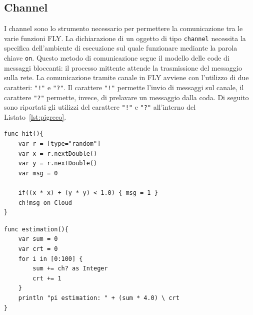 \subsection{Channel}
I channel sono lo strumento necessario per permettere la comunicazione tra le varie funzioni FLY. La dichiarazione di un oggetto di tipo \verb|channel| necessita la specifica dell'ambiente di esecuzione sul quale funzionare mediante la parola chiave \verb|on|. Questo metodo di comunicazione segue il modello delle code di messaggi bloccanti: il processo mittente attende la trasmissione del messaggio sulla rete. La comunicazione tramite canale in FLY avviene con l'utilizzo di due caratteri: \verb|"!"| e \verb|"?"|. Il carattere \verb|"!"| permette l'invio di messaggi sul canale, il carattere \verb|"?"| permette, invece, di prelavare un messaggio dalla coda. Di seguito sono riportati gli utilizzi del carattere \verb|"!"| e \verb|"?"| all'interno del Listato~\ref{lst:pigreco}.
\begin{lstlisting}[language=FLY,firstnumber=7,label={lst:r},belowskip=-0.8 \baselineskip]
func hit(){	
    var r = [type="random"]
    var x = r.nextDouble()
    var y = r.nextDouble()
    var msg = 0
    
    if((x * x) + (y * y) < 1.0) { msg = 1 }
    ch!msg on Cloud
}
\end{lstlisting}
\begin{lstlisting}[language=FLY,firstnumber=18,label={lst:r},belowskip=-0.8 \baselineskip]
func estimation(){
    var sum = 0
    var crt = 0
    for i in [0:100] {
        sum += ch? as Integer
        crt += 1
    }
    println "pi estimation: " + (sum * 4.0) \ crt
}
\end{lstlisting}


